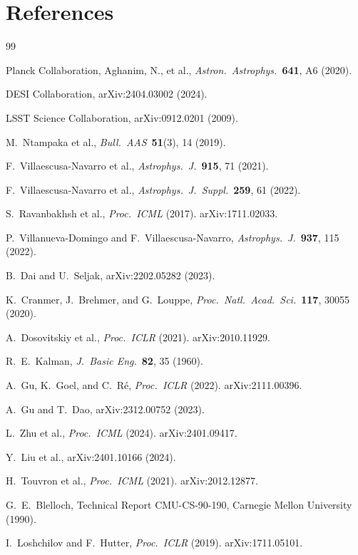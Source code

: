 \documentclass[twocolumn,showpacs,preprintnumbers,amsmath,amssymb,aps,prd]{revtex4-2}
\begin{document}
\section*{References}
\begin{thebibliography}{99}

{Planck Collaboration}, Aghanim, N., et al.,
\textit{Astron.\ Astrophys.}\ \textbf{641}, A6 (2020).

{DESI Collaboration},
arXiv:2404.03002 (2024).

{LSST Science Collaboration},
arXiv:0912.0201 (2009).

M.~Ntampaka et al.,
\textit{Bull.\ AAS}\ \textbf{51}(3), 14 (2019).

F.~Villaescusa-Navarro et al.,
\textit{Astrophys.\ J.}\ \textbf{915}, 71 (2021).

F.~Villaescusa-Navarro et al.,
\textit{Astrophys.\ J.\ Suppl.}\ \textbf{259}, 61 (2022).

S.~Ravanbakhsh et al.,
\textit{Proc.\ ICML} (2017). arXiv:1711.02033.

P.~Villanueva-Domingo and F.~Villaescusa-Navarro,
\textit{Astrophys.\ J.}\ \textbf{937}, 115 (2022).

B.~Dai and U.~Seljak,
arXiv:2202.05282 (2023).

K.~Cranmer, J.~Brehmer, and G.~Louppe,
\textit{Proc.\ Natl.\ Acad.\ Sci.}\ \textbf{117}, 30055 (2020).

A.~Dosovitskiy et al.,
\textit{Proc.\ ICLR} (2021). arXiv:2010.11929.

R.~E.~Kalman,
\textit{J.\ Basic Eng.}\ \textbf{82}, 35 (1960).

A.~Gu, K.~Goel, and C.~R\'{e},
\textit{Proc.\ ICLR} (2022). arXiv:2111.00396.

A.~Gu and T.~Dao,
arXiv:2312.00752 (2023).

L.~Zhu et al.,
\textit{Proc.\ ICML} (2024). arXiv:2401.09417.

Y.~Liu et al.,
arXiv:2401.10166 (2024).

H.~Touvron et al.,
\textit{Proc.\ ICML} (2021). arXiv:2012.12877.

G.~E.~Blelloch,
Technical Report CMU-CS-90-190, Carnegie Mellon University (1990).

I.~Loshchilov and F.~Hutter,
\textit{Proc.\ ICLR} (2019). arXiv:1711.05101.

\end{thebibliography}
\end{document}
